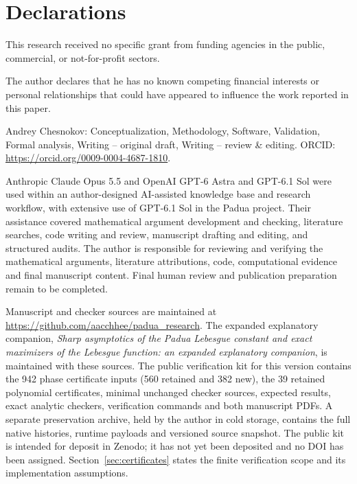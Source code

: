 \documentclass[pdflatex,sn-mathphys-num]{sn-jnl}
\theoremstyle{thmstyleone}
\theoremstyle{thmstyletwo}
\begin{document}
\section*{Declarations}
This research received no specific grant from funding agencies in the
public, commercial, or not-for-profit sectors.

The author declares that he has no known competing financial interests or
personal relationships that could have appeared to influence the work
reported in this paper.

Andrey Chesnokov: Conceptualization, Methodology, Software, Validation,
Formal analysis, Writing -- original draft, Writing -- review \& editing.
ORCID: \url{https://orcid.org/0009-0004-4687-1810}.

Anthropic Claude Opus 5.5 and OpenAI GPT-6 Astra and GPT-6.1 Sol were used
within an
author-designed AI-assisted knowledge base and research workflow, with
extensive use of GPT-6.1 Sol in the Padua project. Their assistance covered
mathematical argument development and checking, literature searches,
code writing and review, manuscript drafting and editing, and structured
audits. The author is responsible for reviewing and verifying the
mathematical arguments, literature attributions, code, computational
evidence and final manuscript content. Final human review and publication
preparation remain to be completed.

Manuscript and checker sources are maintained at
\url{https://github.com/aacchhee/padua_research}.
The expanded explanatory companion, \emph{Sharp asymptotics of the Padua Lebesgue constant and exact maximizers of the Lebesgue function: an expanded explanatory companion}, is maintained with these sources.
The public verification kit for this version contains the 942 phase
certificate inputs (560 retained and 382 new), the 39 retained polynomial
certificates, minimal unchanged checker sources, expected results, exact
analytic checkers, verification commands and both manuscript PDFs.
A separate preservation archive, held by the author in cold storage,
contains the full native histories, runtime payloads and versioned source
snapshot. The public kit is intended for deposit in Zenodo; it has not
yet been deposited and no DOI has been assigned.
Section~\ref{sec:certificates} states the finite verification scope and
its implementation assumptions.


\end{document}
